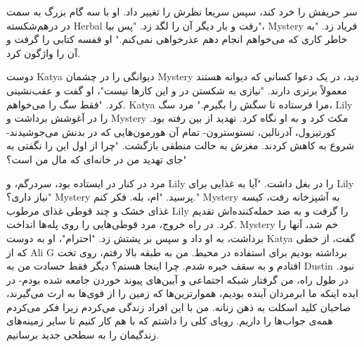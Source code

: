 سر حریفش را خرد کند، سپس سریعا نظرش را تغییر داد. او با سه گام بزرگ
به سمت در درهم‌شکسته Herbal رفت و بار دیگر آن را لگد زد.
"پس بیا"، Mystery فریاد زد. "به خاطر کاری که می‌خواهم انجام دهم عذرخواهی
نمی‌کنم."
او قفسه کتابی را گرفت و آن را واژگون کرد.

دوست Katya دیوانگی را در چشمان Mystery دید، در یک دعوا کسانی که
دیوانه هستند معمولاً برتری دارند. "نیازی به شکستن در و این کارها نیست"،
او گفت و عقب‌نشینی کرد. "فقط سگ را می‌خواهم. Katya مرا فرستاده تا
سگش را بگیرم."
مرد سگ، Lily را در آغوشش برداشت و Mystery مکث کرد و به او نگاه کرد.
تهدید از بین رفته بود. کورتیزول، آدرنالین، تستوسترون- تمام آن هورمون‌هایی
که در بدنش می‌جوشیدند- شروع به کاهش کردند. مغزش به حالت منطقی بازگشت.
"چرا از اول این را نگفتی به جای تهدید من در خانه‌ای که مال من است؟"

مرد در کنار در ایستاده بود، سردرگم، و Lily را در بغل داشت.
"آیا به غذایی برای Lily نیاز داری؟" Mystery پرسید.
"ام، بله. فکر کنم."
Mystery به آشپزخانه رفت، کیسه غذای خشک و چند قوطی غذای
مرطوب Lily را گرفت و به ضد حمله‌کننده‌اش تقدیم کرد.
در راه خروج، مرد قوطی‌هایی را روی پله‌ها انداخت. Mystery
خم شد، آنها را برداشت، به او داد و سپس بر پشتش زد.
"احترام"، او به دوست Katya گفت، از خطی که از Ali G 
برداشته بودیم برای استفاده در محیط.
من به طبقه بالا رفتم، روی تخت افتادم و به سقف خیره شدم.
چرا اینجا هستم؟ دیگر فقط حسادت من به Dustin نبود. در طول
راه، من گرفتار شبکه اجتماعی و آیین‌های پیوند خوردن جامعه شده بودم-
در ایده اینکه ما ابرمردان آینده بودیم، هموارترین‌ها که زمین را از قوی‌ها
به ارث می‌گیرند، صاحبان کلید اسکلت به ذهن زنانه. من با این افراد
زندگی می‌کردم زیرا فکر می‌کردم همه‌ی جواب‌ها را داریم. رویای
کلی را داشتم که با هم کار کنیم تا سایر زمینه‌های زندگیمان را به سطحی جدید برسانیم.